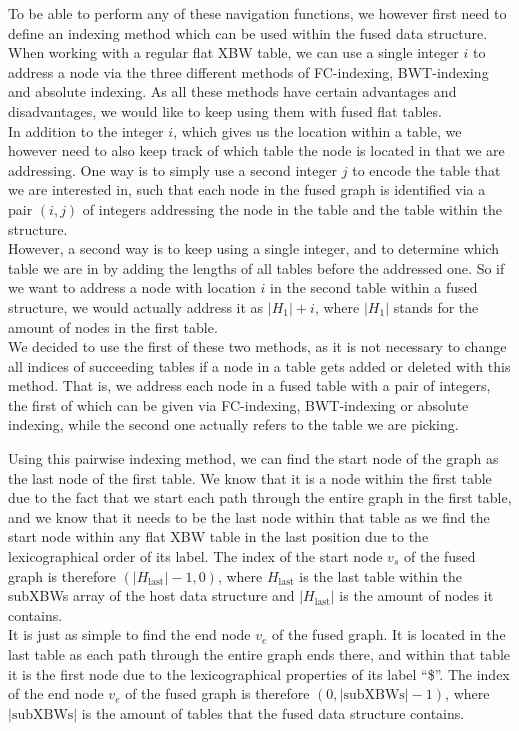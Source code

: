 \documentclass[a4paper,12pt,twoside,BCOR=10mm]{scrbook}
\begin{document}
To be able to perform any of these navigation functions, we however first need to
define an indexing method which can be used within the fused data structure.
When working with a regular flat XBW table, we can use a single integer $ i $ to
address a node via the three different methods of FC-indexing, BWT-indexing and absolute indexing.
As all these methods have certain advantages and disadvantages, we would like to
keep using them with fused flat tables. \\
In addition to the integer $ i $, which gives us the location within a table,
we however need to also keep track of which table the node is located in that we are addressing.
One way is to simply use a second integer $ j $ to encode the table that we are interested in,
such that each node in the fused graph is identified via a pair $ (i, j) $ of integers addressing the
node in the table and the table within the structure. \\
However, a second way is to keep using a single integer, and to determine which table we are in
by adding the lengths of all tables before the addressed one. So if we want to address a node
with location $ i $ in the second table within a fused structure, we would actually address it as $ | H_1 | + i $,
where $ | H_1 | $ stands for the amount of nodes in the first table. \\
We decided to use the first of these two methods, as it is not necessary to change all indices
of succeeding tables if a node in a table gets added or deleted with this method.
That is, we address each node in a fused table with a pair of integers, the first of which
can be given via FC-indexing, BWT-indexing or absolute indexing, while the second one
actually refers to the table we are picking.

Using this pairwise indexing method, we can find the start node of the graph as
the last node of the first table.
We know that it is a node within the first table due to the fact that we start each path
through the entire graph
in the first table, and we know that it needs to be the last node within that table
as we find the start node within any flat XBW table in the last position due to
the lexicographical order of its label.
The index of the start node $ v_s $ of the fused graph
is therefore $ ( | H_{\textrm{last}} | - 1, 0 ) $,
where $ H_{\textrm{last}} $ is the last table within the subXBWs array of the host data structure and
$ | H_{\textrm{last}} | $ is the amount of nodes it contains. \\
It is just as simple to find the end node $ v_e $ of the fused graph.
It is located in the last table as each path through the entire graph ends there,
and within that table it is the first node due to the lexicographical properties of
its label “\$”.
The index of the end node $ v_e $ of the fused graph
is therefore $ ( 0, | \textrm{subXBWs} | - 1 ) $,
where $ | \textrm{subXBWs} | $ is the amount of tables
that the fused data structure contains.
\end{document}
